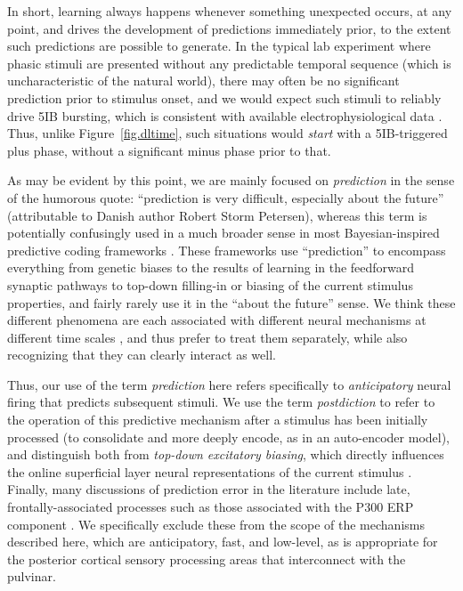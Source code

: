 \documentclass[11pt,twoside]{article}
\newif\myifpdf
\begin{document}
In short, learning always happens whenever something unexpected occurs, at any point, and drives the development of predictions immediately prior, to the extent such predictions are possible to generate.  In the typical lab experiment where phasic stimuli are presented without any predictable temporal sequence (which is uncharacteristic of the natural world), there may often be no significant prediction prior to stimulus onset, and we would expect such stimuli to reliably drive 5IB bursting, which is consistent with available electrophysiological data \citep{Bender82,PetersenRobinsonKeys85,BenderYouakim01,Robinson93,LuczakBarthoHarris09,LuczakBarthoHarris13,KomuraNikkuniHirashimaEtAl13,ZhouSchaferDesimone16}.  Thus, unlike Figure~\ref{fig.dltime}, such situations would \emph{start} with a 5IB-triggered plus phase, without a significant minus phase prior to that.

As may be evident by this point, we are mainly focused on \emph{prediction} in the sense of the humorous quote: ``prediction is very difficult, especially about the future'' (attributable to Danish author Robert Storm Petersen), whereas this term is potentially confusingly used in a much broader sense in most Bayesian-inspired predictive coding frameworks \citep{RaoBallard99,Friston05,deLangeHeilbronKok18}.
These frameworks use ``prediction'' to encompass everything from genetic biases to the results of learning in the feedforward synaptic pathways to top-down filling-in or biasing of the current stimulus properties, and fairly rarely use it in the ``about the future'' sense.   We think these different phenomena are each associated with different neural mechanisms at different time scales \citep{OReillyHazyHerd16,OReillyWyatteHerdEtAl13,OReillyMunakataFrankEtAl12}, and thus prefer to treat them separately, while also recognizing that they can clearly interact as well.

Thus, our use of the term \emph{prediction} here refers specifically to \emph{anticipatory} neural firing that predicts subsequent stimuli.  We use the term \emph{postdiction} to refer to the operation of this predictive mechanism after a stimulus has been initially processed (to consolidate and more deeply encode, as in an auto-encoder model), and distinguish both from \emph{top-down excitatory biasing}, which directly influences the online superficial layer neural representations of the current stimulus \citep{DesimoneDuncan95,ReynoldsChelazziDesimone99,MillerCohen01,OReillyWyatteHerdEtAl13}.  Finally, many discussions of prediction error in the literature include late, frontally-associated processes such as those associated with the P300 ERP component \citep{HolroydColes02}.  We specifically exclude these from the scope of the mechanisms described here, which are anticipatory, fast, and low-level, as is appropriate for the posterior cortical sensory processing areas that interconnect with the pulvinar.
\end{document}

